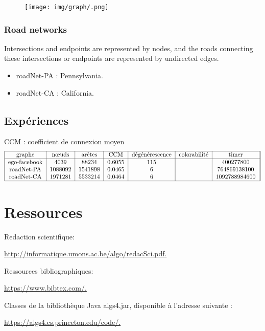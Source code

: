 \begin{figure}[H]
  \centering
	\texttt{[image: img/graph/.png]}
  \label{fig:logo}
\end{figure}


\subsubsection{Road networks}
Intersections and endpoints are represented by nodes, and the roads connecting these intersections or endpoints are represented by undirected edges.

\begin{itemize}
    \item roadNet-PA : Pennsylvania.
    \item roadNet-CA : California.
\end{itemize}

\subsection{Expériences }
CCM : coefficient de connexion moyen
\begin{align}

\begin{tabular}{|c|c|c|c|c|c|c|
                |c|c|c|c|c|c|c|}
\hline
graphe & nœuds & arêtes & CCM  & dégénérescence & colorabilité & timer \\
\hline

ego-facebook & 4039 & 88234 & 0.6055 & 115 &  & 400277800 \\
roadNet-PA & 1088092 & 1541898 & 0.0465 & 6 &  & 764869138100   \\
roadNet-CA & 1971281 & 5533214 & 0.0464 & 6 &  & 1092788984600   \\

\hline
\end{tabular}
\end{align}
\newpage



\section{Ressources}

Redaction scientifique:

\href{http://informatique.umons.ac.be/algo/redacSci.pdf.}{http://informatique.umons.ac.be/algo/redacSci.pdf.
}

Ressources bibliographiques:

\href{https://www.bibtex.com/.}{https://www.bibtex.com/.}


Classes de la bibliothèque Java
algs4.jar, disponible à l’adresse suivante :

\href{https://algs4.cs.princeton.edu/code/.}{https://algs4.cs.princeton.edu/code/.}


